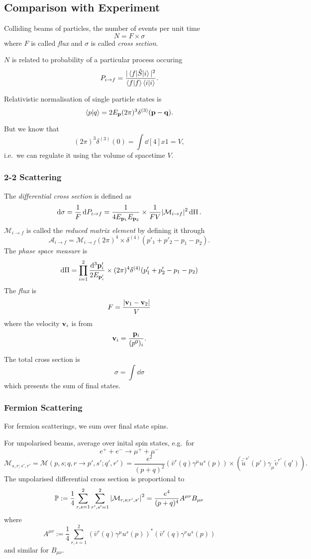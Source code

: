 \documentclass[a4paper,11pt]{article}
\begin{document}
	\subsection{Comparison with Experiment}
	Colliding beams of particles, the number of events per unit time
	\[
		N = F \times \sigma
	\]
	where $F$ is called \emph{flux} and $\sigma$ is called \emph{cross section}.

	$N$ is related to probability of a particular process occuring
	\[
		P _{i \to f} = \frac{|\mel{f}{\hat S}{i}|^2}{\braket{f}{f} \braket{i}{i}}.
	\]
	
	Relativistic normalisation of single particle states is
	\[
		\braket{p}{q} = 2 E _{\vb p} (2 \pi)^3 \delta ^{(3)}(\vb p - \vb q).
	\]

	But we know that 
	\[
		(2 \pi)^3 \delta ^{(3)}(0) = \int \dd[4]{x} 1 = V,
	\]
	i.e.\ we can regulate it using the volume of spacetime $V$. 

	\subsubsection{2-2 Scattering}

	The \emph{differential cross section} is defined as 
	\[
		\dd{\sigma} = \frac{1}{F} \dd{P _{i \to f}} = \frac{1}{4 E _{\vb p_1} E _{\vb p_2}} \times \frac{1}{F V} |\mathcal{M} _{i \to f}|^2 \dd{\Pi}.
	\]
	$\mathcal{M}_{i \to f}$ is called the \emph{reduced matrix element} by defining it through
	\[
		\mathcal{A}_{i \to f} = \mathcal{M}_{i \to f} (2 \pi)^4 \times \delta ^{(4)}(p'_1 + p'_2 - p_1 - p_2).
	\]
	The \emph{phase space measure} is 
	\[
		\dd{\Pi} = \prod _{i = 1}^{2} \frac{\dd[3]{\vb p'_i}}{2 E _{\vb p'_i}} \times (2 \pi)^4 \delta ^{(4)}(p'_1 + p'_2 - p_1 - p_2)
	\]
	The \emph{flux} is
	\[
		F = \frac{\abs{\vb v_1 - \vb v_2}}{V}
	\]
	where the velocity $\vb v_i$ is from
	\[
		\vb v_i = \frac{\vb p_i}{(p^0)_i}.
	\]
	
	The total cross section is
	\[
		\sigma = \int \dd{\sigma}
	\]
	which presents the sum of final states.

	\subsubsection{Fermion Scattering}
	For fermion scatterings, we sum over final state spins.	
	
	For unpolarised beams, average over inital spin states, e.g.\ for 
	\[
		e^+ + e^- \to \mu^+ + \mu^-
	\]
	\[
		\mathcal{M}_{s,r;s',r'} = \mathcal{M}(p,s;q,r \to p',s';q',r') = \frac{e^2}{(p+q)^2} (\bar v^r(q) \gamma^\mu u^s(p)) \times (\bar{\tilde u}^{s'}(p')\gamma_\mu \tilde v ^{r'}(q')).
	\]
	The unpolarised differential cross section is proportional to 
	\[
		\mathbb{P} := \frac{1}{4} \sum _{r,s = 1}^2 \sum _{r',s'=1}^2\abs{\mathcal{M}_{r,s;r',s'}}^2 = \frac{e^4}{(p + q)^4} A ^{\mu \nu} B _{\mu \nu}
	\]
	where 
	\[
		A ^{\mu \nu} := \frac{1}{4} \sum _{r,s = 1}^2 (\bar v^r (q) \gamma^\mu u^s(p))^*(\bar v^r (q) \gamma^\nu u^s(p))
	\]
	and similar for $B _{\mu \nu}$.
\end{document}
